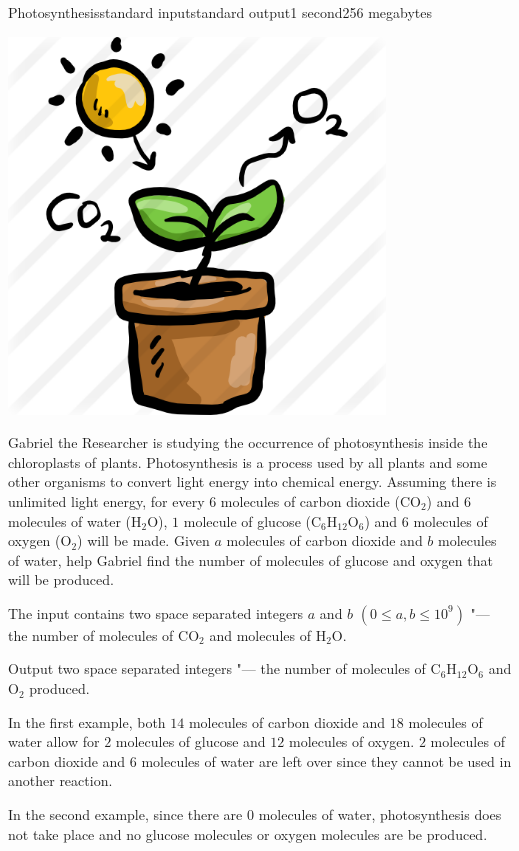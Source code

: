 \begin{problem}{Photosynthesis}{standard input}{standard output}{1 second}{256 megabytes}

\begin{center}
  \includegraphics[height=10cm]{photosynthesis-clipart-25.png} \\
\end{center}


Gabriel the Researcher is studying the occurrence of photosynthesis inside the chloroplasts of plants. Photosynthesis is a process used by all plants and some other organisms to convert light energy into chemical energy. Assuming there is unlimited light energy, for every $6$ molecules of carbon dioxide ($\text{CO}_2$) and $6$ molecules of water ($\text{H}_2\text{O}$), $1$ molecule of glucose ($\text{C}_6\text{H}_{12}\text{O}_6$) and $6$ molecules of oxygen ($\text{O}_2$) will be made. Given $a$ molecules of carbon dioxide and $b$ molecules of water, help Gabriel find the number of molecules of glucose and oxygen that will be produced.

\InputFile
The input contains two space separated integers $a$ and $b$ $(0\le a,b\le 10^9)$ "--- the number of molecules of $\text{CO}_2$ and molecules of $\text{H}_2\text{O}$.

\OutputFile
Output two space separated integers "--- the number of molecules of $\text{C}_6\text{H}_{12}\text{O}_6$ and $\text{O}_2$ produced.

\Examples

\begin{example}
%
%
\end{example}

\Note
In the first example, both $14$ molecules of carbon dioxide and $18$ molecules of water allow for $2$ molecules of glucose and $12$ molecules of oxygen. $2$ molecules of carbon dioxide and $6$ molecules of water are left over since they cannot be used in another reaction.


In the second example, since there are $0$ molecules of water, photosynthesis does not take place and no glucose molecules or oxygen molecules are be produced.

\end{problem}


